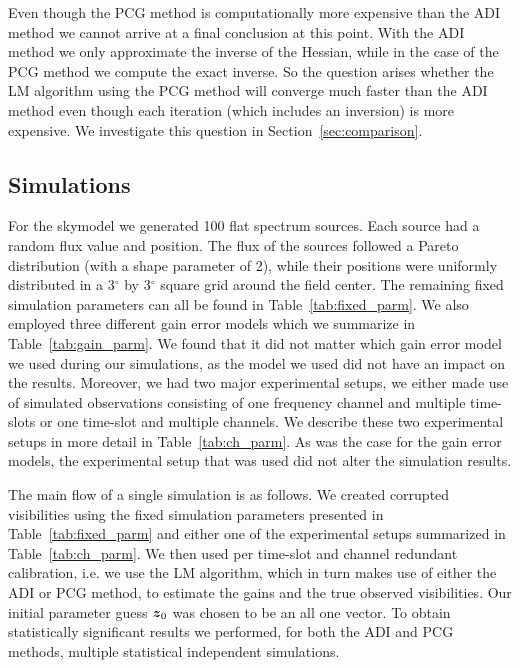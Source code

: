 \documentclass[useAMS,usenatbib]{mn2e}
\newcommand{\bz}{\bmath{z}}
\begin{document}

Even though the PCG method is computationally more expensive than the ADI method we cannot arrive at a final conclusion at this point. With the ADI method 
we only approximate the inverse of the Hessian, while in the case of the PCG method we compute the exact inverse. So the question arises whether the LM algorithm using the PCG method 
will converge much faster than the ADI method even though each iteration (which includes an inversion) is more expensive. We investigate this question in Section~\ref{sec:comparison}.

\subsection{Simulations}
\label{sec:simulations}
For the skymodel we generated 100 flat spectrum sources. Each source had a random flux value and position. The flux of the sources followed a Pareto distribution (with a shape parameter of 2), while their positions were uniformly 
distributed in a 3$^{\circ}$ by 3$^{\circ}$ square grid around the field center. The remaining fixed simulation parameters can all be found in Table~\ref{tab:fixed_parm}. 
We also employed three different gain error models which we summarize in Table~\ref{tab:gain_parm}. We found that it did not matter which gain error model we used during
our simulations, as the model we used did not have an impact on the results. Moreover, we had two major experimental setups, we either made use of simulated observations consisting of one frequency channel and multiple time-slots or one time-slot and multiple channels.
We describe these two experimental setups in more detail in Table~\ref{tab:ch_parm}. As was the case for the gain error models, the experimental setup 
that was used did not alter the simulation results. 

The main flow of a single simulation is as follows. We created corrupted visibilities using the fixed simulation parameters presented in Table~\ref{tab:fixed_parm} and either one of the experimental setups summarized in Table~\ref{tab:ch_parm}. We then used per time-slot and channel redundant calibration, i.e. we use the LM algorithm, which in turn makes use of either the ADI or PCG method, to 
estimate the gains and the true observed visibilities. Our initial parameter guess $\bz_0$ was chosen to be an all one vector. To obtain statistically significant results we performed, for both the ADI and PCG methods, multiple statistical independent simulations. 
\end{document}
